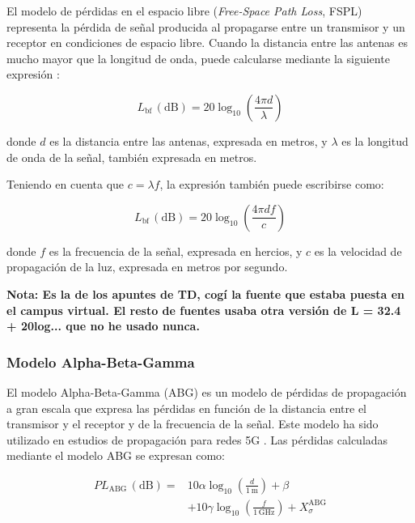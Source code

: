 El modelo de pérdidas en el espacio libre (\textit{Free-Space Path Loss}, FSPL) representa la pérdida de señal producida al propagarse entre un transmisor y un receptor en condiciones de espacio libre. Cuando la distancia entre las antenas es mucho mayor que la longitud de onda, puede calcularse mediante la siguiente expresión \cite{itur_p341}:

\begin{equation}
    L_{\mathrm{bf}}\,(\mathrm{dB})=20\log_{10}\left(\frac{4\pi d}{\lambda}\right)
\end{equation}

donde $d$ es la distancia entre las antenas, expresada en metros, y $\lambda$ es la longitud de onda de la señal, también expresada en metros.

Teniendo en cuenta que $c=\lambda f$, la expresión también puede escribirse como:

\begin{equation}
    L_{\mathrm{bf}}\,(\mathrm{dB})=20\log_{10}\left(\frac{4\pi d f}{c}\right)
\end{equation}

donde $f$ es la frecuencia de la señal, expresada en hercios, y $c$ es la velocidad de propagación de la luz, expresada en metros por segundo.

\par\medskip
\textbf{Nota: Es la de los apuntes de TD, cogí la fuente que estaba puesta en el campus virtual. El resto de fuentes usaba otra versión de L = 32.4 + 20log... que no he usado nunca.}
\par\medskip


\subsubsection{Modelo Alpha-Beta-Gamma}

El modelo Alpha-Beta-Gamma (ABG) es un modelo de pérdidas de propagación a gran escala que expresa las pérdidas en función de la distancia entre el transmisor y el receptor y de la frecuencia de la señal. Este modelo ha sido utilizado en estudios de propagación para redes 5G \cite{abg}. Las pérdidas calculadas mediante el modelo ABG se expresan como:

\begin{equation}
\begin{split}
    PL_{\mathrm{ABG}}\,(\mathrm{dB})={}&10\alpha\log_{10}\left(\frac{d}{1\,\mathrm{m}}\right)
    +\beta \\ &+10\gamma\log_{10}\left(\frac{f}{1\,\mathrm{GHz}}\right)
    +X_{\sigma}^{\mathrm{ABG}}
\end{split}
\end{equation}

